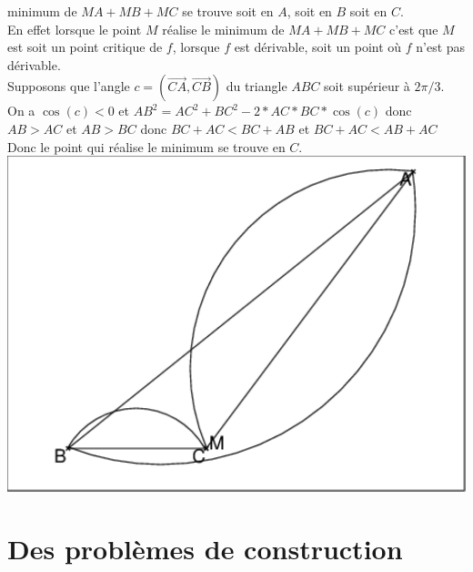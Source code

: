 \documentclass[a4paper,11pt]{book}
\begin{document}
minimum de $MA+MB+MC$ se trouve soit en $A$, soit en $B$ soit en $C$.\\
 En effet lorsque le point $M$ r\'ealise le minimum de $MA+MB+MC$ c'est que $M$ 
est soit un point critique de $f$, lorsque $f$ est 
d\'erivable, soit un point o\`u $f$ n'est pas d\'erivable.\\ 
Supposons que l'angle $c=(\overrightarrow{CA},\overrightarrow{CB})$ du triangle 
$ABC$ soit sup\'erieur \`a $2\pi/3$.\\
On a $\cos(c)<0$ et $AB^2=AC^2+BC^2-2*AC*BC*\cos(c)$
donc $AB>AC$ et $AB>BC$ donc $BC+AC<BC+AB$ et $BC+AC<AB+AC$ \\
Donc le point qui r\'ealise le minimum se trouve en $C$.\\
\includegraphics[width=\textwidth]{mabc3}

\section{Des probl\`emes de construction}
\end{document}

